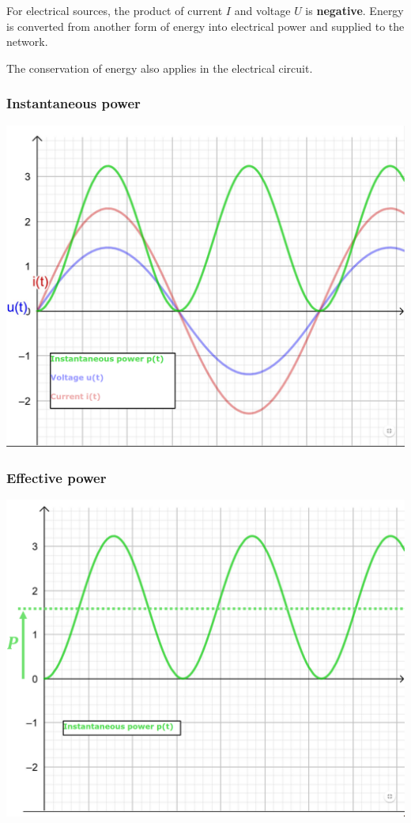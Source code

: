 \documentclass{article}
\begin{document}
For electrical sources, the product of current $I$ and voltage $U$ is
\textbf{negative}. Energy is converted from another form of energy into
electrical power and supplied to the network.

The conservation of energy also applies in the electrical circuit.

\subsubsection{Instantaneous power}
\begin{center}
    \includegraphics[width=.7\textwidth]{media/instant_power.png}
\end{center}

\subsubsection{Effective power}
\begin{center}
    \includegraphics[width=.7\textwidth]{media/effective_power.png}
\end{center}
\end{document}
